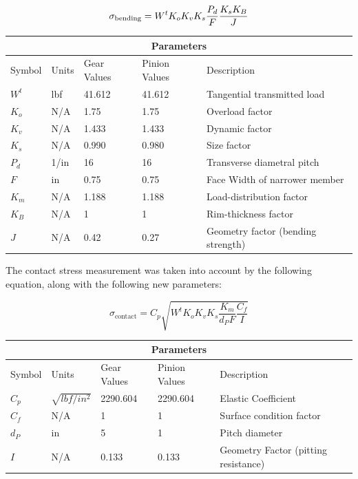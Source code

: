 \documentclass[letterpaper,12pt]{article}
\begin{document}
\begin{equation}
\sigma_{\text{bending}} = W^t K_o K_v K_s \frac{P_d}{F}\frac{K_s K_B}{J} \\
\end{equation}

\begin{center}
	\begin{tabular}{ |p{2cm}||p{2cm}|p{2.3cm}|p{2.3cm}|p{6cm}|  }
		\hline
		\multicolumn{5}{|c|}{Parameters} \\
		\hline
		Symbol & Units & Gear Values & Pinion Values & Description\\
		\hline
		$W^t$ & lbf & 41.612 & 41.612 & Tangential transmitted load\\
		$K_o$ & N/A & 1.75 & 1.75 & Overload factor\\
		$K_v$ & N/A & 1.433 & 1.433 & Dynamic factor\\
		$K_s$ & N/A & 0.990 & 0.980 & Size factor\\
		$P_{d}$ & 1/in & 16 & 16 & Transverse diametral pitch\\
		$F$ & in & 0.75 & 0.75 & Face Width of narrower member\\
		$K_m$ & N/A & 1.188 & 1.188 & Load-distribution factor\\
		$K_{B}$ & N/A & 1 & 1 & Rim-thickness factor\\
		$J$ & N/A & 0.42 & 0.27 & Geometry factor (bending strength)\\
		\hline
	\end{tabular}
\end{center}

\noindent The contact stress measurement was taken into account by the following equation, along with the following new parameters:

\begin{equation}
\sigma_{\text{contact}} = C_{p}\sqrt{W^t K_o K_v K_s \frac{K_m}{d_P F}\frac{C_f}{I}}
\end{equation}

\begin{center}
	\begin{tabular}{ |p{2cm}||p{2cm}|p{2.3cm}|p{2.3cm}|p{6cm}|  }
		\hline
		\multicolumn{5}{|c|}{Parameters} \\
		\hline
		Symbol & Units & Gear Values & Pinion Values & Description\\
		\hline
		$C_p$ & $\sqrt{lbf/in^2}$ & 2290.604 & 2290.604 & Elastic Coefficient\\
		$C_f$ & N/A & 1 & 1 & Surface condition factor\\
		$d_P$ & in & 5 & 1 & Pitch diameter\\
		$I$ & N/A & 0.133 & 0.133 & Geometry Factor (pitting resistance)\\
		\hline
	\end{tabular}
\end{center}
\end{document}
